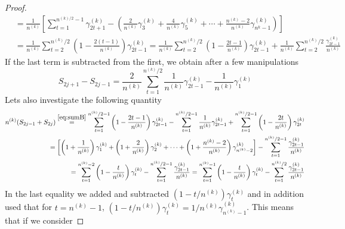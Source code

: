 \documentclass[11pt,english,a4paper]{article}
\begin{document}
\begin{proof}
\begin{align}
&=  \frac{1}{n^{(k)}} \left[ \sum_{t=1}^{n^{(k)/2}-1}\gamma_{2t+1}^{(k)} - \left(\frac{2}{n^{(k)}} \gamma^{(k)}_{3} + \frac{4}{n^{(k)}} \gamma^{(k)}_{5} + \cdots + \frac{n^{(k)} - 2}{n^{(k)}} \gamma^{(k)}_{n^{k} - 1} \right)\right]\nonumber
 \\
 &= \frac{1}{n^{(k)}}\sum_{t=2}^{n^{(k)}/2} \left( 1 - \frac{2(t-1)}{n^{(k)}} \right) \gamma^{(k)}_{2t-1} = \frac{1}{n^{(k)}} \sum_{t=2}^{n^{(k)}/2} \left( 1 - \frac{2t-1}{n^{(k)}} \right) \gamma^{(k)}_{2t - 1} + \frac{1}{n^{(k)}}\sum_{t=2}^{n^{(k)}/2} \frac{\gamma^{(k)}_{2t - 1}}{n^{(k)}}  \nonumber
\end{align}
If the last term is subtracted from the first, we obtain after a few manipulations
\begin{equation}
S_{2j+1} - S_{2j-1} = \frac{2}{n^{(k)}} \sum_{t=1}^{n^{(k)}/2} \frac{1}{n^{(k)}} \gamma^{(k)}_{2t - 1} - \frac{1}{n^{(k)}} \gamma^{(k)}_{1} \label{eq:differencesum}
\end{equation}
Lets also investigate the following quantity
\begin{align}
n^{(k)}(S_{2j-1} + S_{2j}) \stackrel{\eqref{eq:sumB} }{=} \sum_{t=1}^{n^{(k)}/2-1} \left( 1 - \frac{2t-1}{n^{(k)}}\right) \gamma^{(k)}_{2t - 1} -  \sum_{t=1}^{n^{(k)}/2-1} \frac{1}{n^{(k)}} \gamma^{(k)}_{2t - 1} + \sum_{t=1}^{n^{(k)}/2-1} \left( 1 - \frac{2t}{n^{(k)}}\right) \gamma^{(k)}_{2t}\nonumber\\
=\left[ \left(1 + \frac{1}{n^{(k)}}\right)\gamma^{(k)}_1 + \left(1 + \frac{2}{n^{(k)}}\right)\gamma^{(k)}_2  + \cdots + \left(1 + \frac{n^{(k)} - 2}{n^{(k)}} \right)\gamma^{(k)}_{n^{(k)} -2 }\right]-  \sum_{t=1}^{n^{(k)}/2-1} \frac{\gamma^{(k)}_{2t - 1}}{n^{(k)}} \nonumber\\
= \sum_{t=1}^{n^{(k)} -2 } \left( 1 - \frac{t}{n^{(k)}} \right)\gamma^{(k)}_{t}-  \sum_{t=1}^{n^{(k)}/2-1} \frac{\gamma^{(k)}_{2t - 1}}{n^{(k)}} = \sum_{t=1}^{n^{(k)} -1 } \left( 1 - \frac{t}{n^{(k)}} \right)\gamma^{(k)}_{t} -  \sum_{t=1}^{n^{(k)}/2} \frac{\gamma^{(k)}_{2t - 1}}{n^{(k)}} \label{eq:nsum}
\end{align}
In the last equality we added and subtracted $(1-t/n^{(k)})\gamma^{(k)}_{t}$ and in addition used that for $t = n^{(k)} - 1$, $(1-t/n^{(k)})\gamma^{(k)}_{t} = 1/n^{(k)}\gamma^{(k)}_{n^{(k)} -1}$. This means that if we consider

\end{proof}
\end{document}
